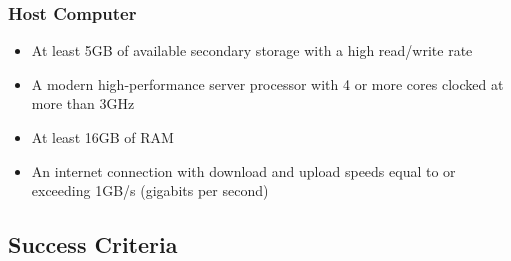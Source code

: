 \documentclass{article}
\begin{document}
    \subsubsection{Host Computer}
    \begin{itemize}
    \item At least 5GB of available secondary storage with a high read/write rate
    \item A modern high-performance server processor with 4 or more cores clocked at more than 3GHz
    \item At least 16GB of RAM
    \item An internet connection with download and upload speeds equal to or exceeding 1GB/s (gigabits per second)
    \end{itemize}
    
    \subsection{Success Criteria}
\end{document}
